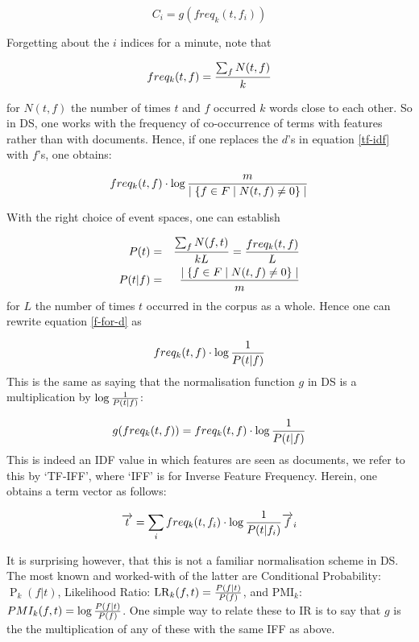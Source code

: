 \begin{equation}
C_i = g(freq_k(t,f_i))
\end{equation}

Forgetting about the $i$ indices for a minute, note that 

\begin{equation}
freq_k(t,f) = {{\sum_f N(t,f)} \over {k}}
\end{equation}

for $N(t, f)$ the number of times $t$ and $f$ occurred  $k$ words close to each other.  So in DS, one works with the frequency of co-occurrence of terms with features rather than with documents. Hence, if one replaces the $d$'s in equation \ref{tf-idf} with $f$'s, one obtains:

\begin{equation}
\label{f-for-d}
freq_k(t, f) \cdot \log{{m} \over {\mid \{f \in F \mid N(t,f)  \neq 0 \}\mid}}
\end{equation}

With the right choice of event spaces, one can establish

\begin{eqnarray}
P(t) &=&  {{\sum_f N(f,t)} \over {kL}} = {{freq_k(t,f)} \over {L}}\\
P(t | f) &=&  {{\mid \{f \in F \mid N(t,f)  \neq 0 \}\mid} \over {m}}
\end{eqnarray}
for $L$ the number of times $t$ occurred in the corpus as a whole.  Hence one can rewrite equation \ref{f-for-d} as

\begin{equation}
freq_k(t,f) \cdot \log{1 \over P(t|f)}
\end{equation}
This is the same as saying that  the normalisation function $g$ in DS is a multiplication by $ \log{1 \over P(t|f)}$:

\[
g(freq_k(t, f)) = freq_k(t,f) \cdot \log{1 \over P(t|f)}
\]
This  is indeed an IDF value in which features are seen as documents, we refer to this by `TF-IFF', where `IFF' is for Inverse Feature Frequency. Herein, one obtains a term vector as follows:

\begin{equation}
\label{vector-word-idf}
\overrightarrow{t}  = \sum_i  freq_k(t,f_i) \cdot \log{1 \over P(t|f_i)}  \overrightarrow{f}_i
\end{equation}


It is surprising however,   that this is not a familiar normalisation scheme in DS. The  most known and worked-with of the latter are  Conditional Probability: $\operatorname{P}_k(f|t)$,  Likelihood Ratio: $\operatorname{LR}_k(f,t) 
= {{P(f \mid t)} \over{P(f)}}$,  and PMI$_k$: $PMI_k (f, t) =  \log{{P(f \mid t)} \over{P(f)}}$.  One simple way to relate these to IR is to say that $g$ is the the multiplication of any of these with the same  IFF as above. 


